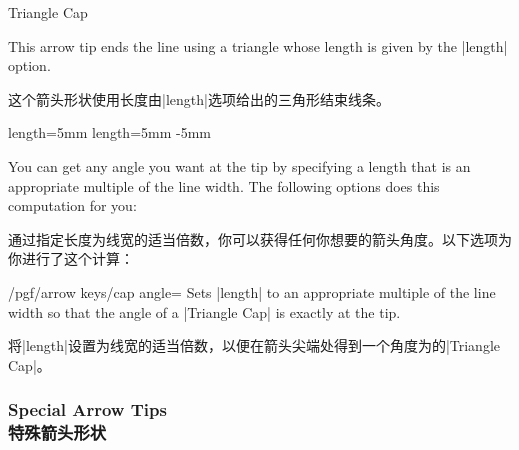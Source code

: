 \begin{arrowcap}{Triangle Cap}{
    This arrow tip ends the line using a triangle whose length is given by the
    |length| option.

    这个箭头形状使用长度由|length|选项给出的三角形结束线条。
}%
{length=5mm}%
{length=5mm}%
{-5mm}

    You can get any angle you want at the tip by specifying a length that is an
    appropriate multiple of the line width. The following options does this
    computation for you:

    通过指定长度为线宽的适当倍数，你可以获得任何你想要的箭头角度。以下选项为你进行了这个计算：
    \begin{key}{/pgf/arrow keys/cap angle=}
        Sets |length| to an appropriate multiple of the line width so that the
        angle of a |Triangle Cap| is exactly  at the tip.

        将|length|设置为线宽的适当倍数，以便在箭头尖端处得到一个角度为的|Triangle Cap|。
    \end{key}

    \begin{arrowcapexamples}
        \arrowcapexample[]
        \arrowcapexample[reversed]
        \arrowcapexample[cap angle=60]
        \arrowcapexample[cap angle=60,reversed]
        \arrowcapexample[length=.5ex]
        \arrowcapexample[slant=.3]
    \end{arrowcapexamples}
\end{arrowcap}


\subsubsection{Special Arrow Tips\\特殊箭头形状}

